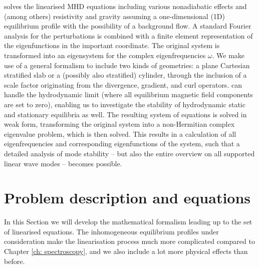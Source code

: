{\legolas} solves the linearised MHD equations including various nonadiabatic effects and (among others) resistivity and gravity assuming a one-dimensional (\gls{1D}) equilibrium profile with the possibility of a background flow. A standard Fourier analysis for the perturbations is combined with a finite element representation of the eigenfunctions in the important coordinate. The original system is transformed into an eigensystem for the complex eigenfrequencies $\omega$. We make use of a general formalism to include two kinds of geometries: a plane Cartesian stratified slab or a (possibly also stratified) cylinder, through the inclusion of a scale factor originating from the divergence, gradient, and curl operators. {\legolas} can handle the hydrodynamic limit (where all equilibrium magnetic field components are set to zero), enabling us to investigate the stability of hydrodynamic static and stationary equilibria as well. The resulting system of equations is solved in weak form, transforming the original system into a non-Hermitian complex eigenvalue problem, which is then solved. This results in a calculation of all eigenfrequencies and corresponding eigenfunctions of the system, such that a detailed analysis of mode stability -- but also the entire overview on all supported linear wave modes -- becomes possible.


\section{Problem description and equations} \label{sec: problem description}
In this Section we will develop the mathematical formalism leading up to the set of linearised equations. The inhomogeneous equilibrium profiles under consideration make the linearisation process much more complicated compared to Chapter \ref{ch: spectroscopy}, and we also include a lot more physical effects than before.

